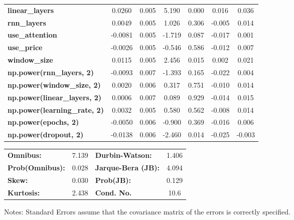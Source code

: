 \begin{center}
\begin{tabular}{lcccccc}
\textbf{linear\_layers}              &       0.0260  &        0.005     &     5.190  &         0.000        &        0.016    &        0.036     \\
\textbf{rnn\_layers}                 &       0.0049  &        0.005     &     1.026  &         0.306        &       -0.005    &        0.014     \\
\textbf{use\_attention}              &      -0.0081  &        0.005     &    -1.719  &         0.087        &       -0.017    &        0.001     \\
\textbf{use\_price}                  &      -0.0026  &        0.005     &    -0.546  &         0.586        &       -0.012    &        0.007     \\
\textbf{window\_size}                &       0.0115  &        0.005     &     2.456  &         0.015        &        0.002    &        0.021     \\
\textbf{np.power(rnn\_layers, 2)}    &      -0.0093  &        0.007     &    -1.393  &         0.165        &       -0.022    &        0.004     \\
\textbf{np.power(window\_size, 2)}   &       0.0020  &        0.006     &     0.317  &         0.751        &       -0.010    &        0.014     \\
\textbf{np.power(linear\_layers, 2)} &       0.0006  &        0.007     &     0.089  &         0.929        &       -0.014    &        0.015     \\
\textbf{np.power(learning\_rate, 2)} &       0.0032  &        0.005     &     0.580  &         0.562        &       -0.008    &        0.014     \\
\textbf{np.power(epochs, 2)}         &      -0.0050  &        0.006     &    -0.900  &         0.369        &       -0.016    &        0.006     \\
\textbf{np.power(dropout, 2)}        &      -0.0138  &        0.006     &    -2.460  &         0.014        &       -0.025    &       -0.003     \\
\bottomrule
\end{tabular}
\begin{tabular}{lclc}
\textbf{Omnibus:}       &  7.139 & \textbf{  Durbin-Watson:     } &    1.406  \\
\textbf{Prob(Omnibus):} &  0.028 & \textbf{  Jarque-Bera (JB):  } &    4.094  \\
\textbf{Skew:}          &  0.030 & \textbf{  Prob(JB):          } &    0.129  \\
\textbf{Kurtosis:}      &  2.438 & \textbf{  Cond. No.          } &     10.6  \\
\bottomrule
\end{tabular}
\end{center}

Notes: \newline
 [1] Standard Errors assume that the covariance matrix of the errors is correctly specified.
